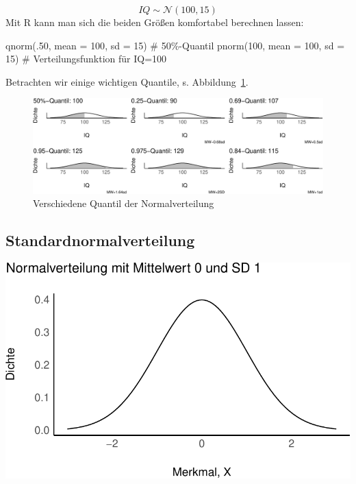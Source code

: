 \documentclass[
  a4paper,
  DIV=11]{scrreprt}
\newenvironment{Shaded}{\begin{snugshade}}{\end{snugshade}}
\newcommand{\AttributeTok}[1]{\textcolor[rgb]{0.40,0.45,0.13}{#1}}
\newcommand{\CommentTok}[1]{\textcolor[rgb]{0.37,0.37,0.37}{#1}}
\newcommand{\DecValTok}[1]{\textcolor[rgb]{0.68,0.00,0.00}{#1}}
\newcommand{\FunctionTok}[1]{\textcolor[rgb]{0.28,0.35,0.67}{#1}}
\newcommand{\NormalTok}[1]{\textcolor[rgb]{0.00,0.23,0.31}{#1}}
\theoremstyle{definition}
\theoremstyle{remark}
\begin{document}
\[IQ \sim \mathcal{N}(100, 15)\] Mit R kann man sich die beiden Größen
komfortabel berechnen lassen:

\begin{Shaded}
\begin{Highlighting}[]
\FunctionTok{qnorm}\NormalTok{(.}\DecValTok{50}\NormalTok{, }\AttributeTok{mean =} \DecValTok{100}\NormalTok{, }\AttributeTok{sd =} \DecValTok{15}\NormalTok{)  }\CommentTok{\# 50\%{-}Quantil}
\FunctionTok{pnorm}\NormalTok{(}\DecValTok{100}\NormalTok{, }\AttributeTok{mean =} \DecValTok{100}\NormalTok{, }\AttributeTok{sd =} \DecValTok{15}\NormalTok{)  }\CommentTok{\# Verteilungsfunktion für IQ=100}
\end{Highlighting}
\end{Shaded}

Betrachten wir einige wichtigen Quantile, s.
Abbildung~\ref{fig-nv-quants2}.

\begin{figure}

{\centering \includegraphics{./Verteilungen_files/figure-pdf/fig-nv-quants2-1.pdf}

}

\caption{\label{fig-nv-quants2}Verschiedene Quantil der
Normalverteilung}

\end{figure}

\hypertarget{standardnormalverteilung}{%
\subsection{Standardnormalverteilung}\label{standardnormalverteilung}}

\includegraphics{./Verteilungen_files/figure-pdf/Normalverteilung-3-1.pdf}
\end{document}

